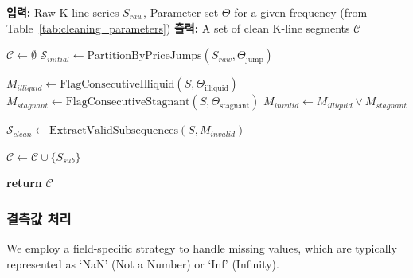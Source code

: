\begin{algorithm}[t]
\caption{저품질 구간 필터링 파이프라인}
\label{alg:segment_filtering}
\begin{algorithmic}[1]
\Statex \textbf{입력:} Raw K-line series $S_{raw}$, Parameter set $\Theta$ for a given frequency (from Table~\ref{tab:cleaning_parameters})
\Statex \textbf{출력:} A set of clean K-line segments $\mathcal{C}$

    \State $\mathcal{C} \leftarrow \emptyset$ 
    \State $\mathcal{S}_{initial} \leftarrow \text{PartitionByPriceJumps}(S_{raw}, \Theta_{\text{jump}})$ 

        \State $M_{illiquid} \leftarrow \text{FlagConsecutiveIlliquid}(S, \Theta_{\text{illiquid}})$ 
        \State $M_{stagnant} \leftarrow \text{FlagConsecutiveStagnant}(S, \Theta_{\text{stagnant}})$ 
        \State $M_{invalid} \leftarrow M_{illiquid} \lor M_{stagnant}$ 

        \State $\mathcal{S}_{clean} \leftarrow \text{ExtractValidSubsequences}(S, M_{invalid})$ 

                \State $\mathcal{C} \leftarrow \mathcal{C} \cup \{S_{sub}\}$ 
            \EndIf
        \EndFor
    \EndFor

    \State \textbf{return} $\mathcal{C}$
\EndFunction
\end{algorithmic}
\end{algorithm}

\subsubsection{결측값 처리}
We employ a field-specific strategy to handle missing values, which are typically represented as `NaN' (Not a Number) or `Inf' (Infinity).

